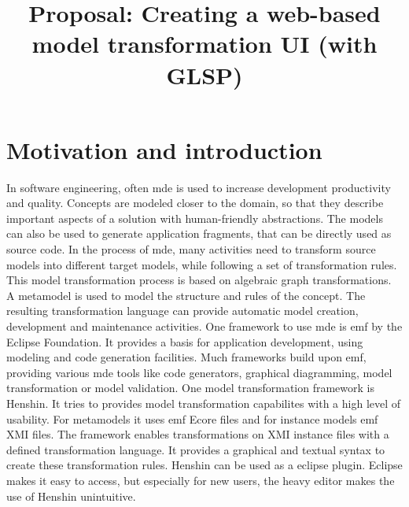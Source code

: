 \documentclass[conference,onecolumn]{IEEEtran}
\begin{document}
  \title{Proposal: Creating a web-based model transformation UI (with GLSP)}

  \author{
    }

  \maketitle

  \IEEEpeerreviewmaketitle

  \section{Motivation and introduction}
  \label{sec:motivation}

  In software engineering, often \ac{mde} is used to increase development productivity and quality. Concepts are modeled closer to the domain, so that they describe important aspects of a solution with human-friendly abstractions. The models can also be used to generate application fragments, that can be directly used as source code. In the process of \ac{mde}, many activities need to transform source models into different target models, while following a set of transformation rules. This model transformation process is based on algebraic graph transformations. A metamodel is used to model the structure and rules of the concept. The resulting transformation language can provide automatic model creation, development and maintenance activities. \cite{transformations-modeldriven} One framework to use \ac{mde} is \ac{emf} by the Eclipse Foundation. It provides a basis for application development, using modeling and code generation facilities. Much frameworks build upon \ac{emf}, providing various \ac{mde} tools like code generators, graphical diagramming, model transformation or model validation. \cite{emf} One model transformation framework is Henshin. \cite{henshin-repo} It tries to provides model transformation capabilites with a high level of usability. \cite{henshin-usability} For metamodels it uses \ac{emf} Ecore files and for instance models \ac{emf} XMI files. The framework enables transformations on XMI instance files with a defined transformation language. It provides a graphical and textual syntax to create these transformation rules. \cite{henshin-repo} Henshin can be used as a eclipse plugin. Eclipse makes it easy to access, but especially for new users, the heavy editor makes the use of Henshin unintuitive.
\end{document}
